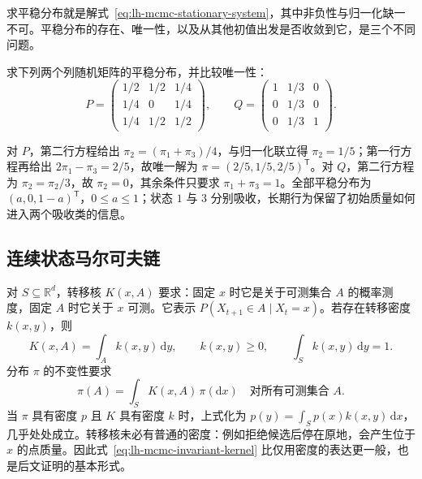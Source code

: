 求平稳分布就是解式~\eqref{eq:lh-mcmc-stationary-system}，其中非负性与归一化缺一不可。平稳分布的存在、唯一性，以及从其他初值出发是否收敛到它，是三个不同问题。

\begin{example}
\label{ex:lh-mcmc-stationary-matrices}
求下列两个列随机矩阵的平稳分布，并比较唯一性：
\[
P=\begin{pmatrix}1/2&1/2&1/4\\1/4&0&1/4\\1/4&1/2&1/2\end{pmatrix},
\qquad
Q=\begin{pmatrix}1&1/3&0\\0&1/3&0\\0&1/3&1\end{pmatrix}.
\]
\end{example}
\begin{solve}
对 $P$，第二行方程给出 $\pi_2=(\pi_1+\pi_3)/4$，与归一化联立得 $\pi_2=1/5$；第一行方程再给出 $2\pi_1-\pi_3=2/5$，故唯一解为 $\pi=(2/5,1/5,2/5)^{\mathsf T}$。对 $Q$，第二行方程为 $\pi_2=\pi_2/3$，故 $\pi_2=0$，其余条件只要求 $\pi_1+\pi_3=1$。全部平稳分布为 $(a,0,1-a)^{\mathsf T}$，$0\leq a\leq1$；状态 $1$ 与 $3$ 分别吸收，长期行为保留了初始质量如何进入两个吸收类的信息。
\end{solve}

\subsection{连续状态马尔可夫链}
\label{subsec:lh-mcmc-continuous-chain}

对 $S\subseteq\mathbb R^d$，转移核 $K(x,A)$ 要求：固定 $x$ 时它是关于可测集合 $A$ 的概率测度，固定 $A$ 时它关于 $x$ 可测。它表示 $P(X_{t+1}\in A\mid X_t=x)$。若存在转移密度 $k(x,y)$，则
\begin{equation}
K(x,A)=\int_A k(x,y)\,\mathrm dy,\qquad
k(x,y)\geq0,\qquad\int_S k(x,y)\,\mathrm dy=1.
\label{eq:lh-mcmc-transition-density}
\end{equation}
分布 $\pi$ 的不变性要求
\begin{equation}
\pi(A)=\int_S K(x,A)\,\pi(\mathrm dx)
\quad\text{对所有可测集合 }A.
\label{eq:lh-mcmc-invariant-kernel}
\end{equation}
当 $\pi$ 具有密度 $p$ 且 $K$ 具有密度 $k$ 时，上式化为 $p(y)=\int_Sp(x)k(x,y)\,\mathrm dx$，几乎处处成立。转移核未必有普通的密度：例如拒绝候选后停在原地，会产生位于 $x$ 的点质量。因此式~\eqref{eq:lh-mcmc-invariant-kernel} 比仅用密度的表达更一般，也是后文证明的基本形式。

